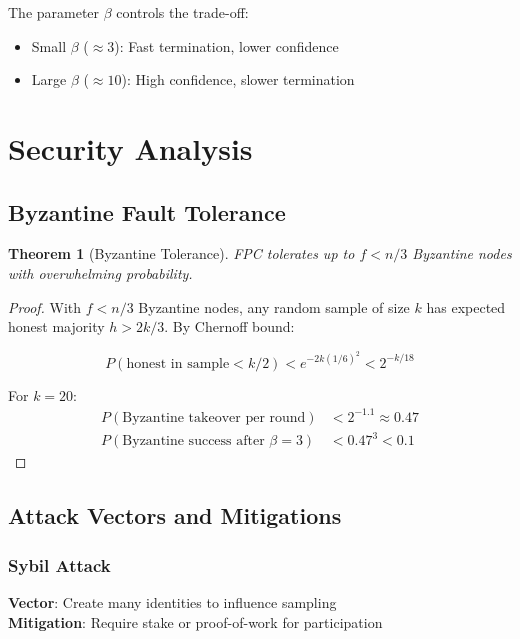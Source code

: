 \documentclass[11pt,a4paper]{article}
\newtheorem{theorem}{Theorem}
\begin{document}
The parameter $\beta$ controls the trade-off:
\begin{itemize}
\item Small $\beta$ ($\approx 3$): Fast termination, lower confidence
\item Large $\beta$ ($\approx 10$): High confidence, slower termination
\end{itemize}

\section{Security Analysis}
\label{sec:security}

\subsection{Byzantine Fault Tolerance}

\begin{theorem}[Byzantine Tolerance]
FPC tolerates up to $f < n/3$ Byzantine nodes with overwhelming probability.
\end{theorem}

\begin{proof}
With $f < n/3$ Byzantine nodes, any random sample of size $k$ has expected honest majority $h > 2k/3$. By Chernoff bound:

\begin{equation}
P(\text{honest in sample} < k/2) < e^{-2k(1/6)^2} < 2^{-k/18}
\end{equation}

For $k = 20$:
\begin{align}
P(\text{Byzantine takeover per round}) &< 2^{-1.1} \approx 0.47 \\
P(\text{Byzantine success after } \beta = 3) &< 0.47^3 < 0.1
\end{align}
\end{proof}

\subsection{Attack Vectors and Mitigations}

\subsubsection{Sybil Attack}
\textbf{Vector}: Create many identities to influence sampling\\
\textbf{Mitigation}: Require stake or proof-of-work for participation
\end{document}
